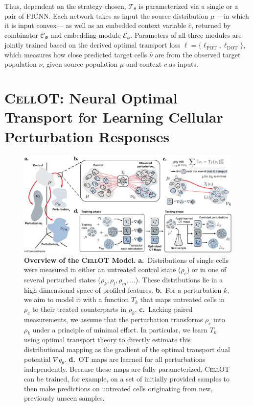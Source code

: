 Thus, dependent on the strategy chosen, $\mathcal{T}_{\theta}$ is parameterized via a single or a pair of PICNN. Each network takes as input the source distribution $\mu$ ---in which it is input convex--- as well as an embedded context variable $\hat{c}$, returned by combinator $\mathcal{C}_\Phi$ and embedding module $\mathcal{E}_\phi$.
Parameters of all three modules are jointly trained based on the derived optimal transport loss $\ell = \{\ell_\text{POT}, \ell_\text{DOT}\}$, which measures how close predicted target cells $\hat{\nu}$ are from the observed target population $\nu$, given source population $\mu$ and context $c$ as inputs.


\section[\textsc{CellOT}: Neural OT for Learning Cell Perturbation Responses]{\textsc{CellOT}: Neural Optimal Transport for Learning Cellular Perturbation Responses}

\begin{figure}
    \centering
    \includegraphics[width=\textwidth]{figures/fig_overview_cellot.pdf}
    \caption{\textbf{Overview of the \textsc{CellOT} Model.} \textbf{a.}~Distributions of single cells were measured in either an untreated control state ($\rho_c$) or in one of several perturbed states ($\rho_k, \rho_l, \rho_m,  \ldots$). These distributions lie in a high-dimensional space of profiled features. \textbf{b.}~For a perturbation $k$, we aim to model it with a function $T_k$ that maps untreated cells in $\rho_c$ to their treated counterparts in $\rho_k$. \textbf{c.}~Lacking paired measurements, we assume that the perturbation transforms $\rho_c$ into $\rho_k$ under a principle of minimal effort. In particular, we learn $T_k$ using optimal transport theory to directly estimate this distributional mapping as the gradient of the optimal transport dual potential $\nabla g_\theta$.
    \textbf{d.}~OT maps are learned for all perturbations independently. Because these maps are fully parameterized, \textsc{CellOT} can be trained, for example, on a set of initially provided samples to then make predictions on untreated cells originating from new, previously unseen samples.}
    \label{fig:overview_cellot}
\end{figure}

